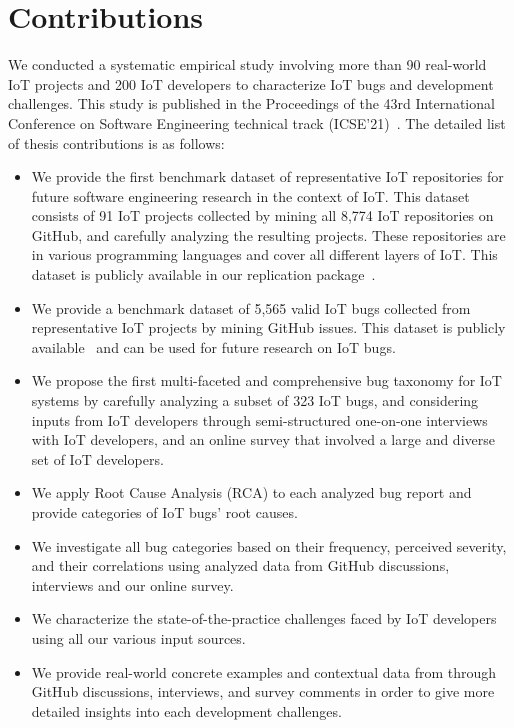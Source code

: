 \section{Contributions  }
We conducted a systematic empirical study involving more than 90 real-world IoT projects and 200 IoT developers to characterize IoT bugs and development challenges. This study is published in the Proceedings of the 43rd International Conference on Software Engineering technical track (ICSE'21)~\cite{makhshari2021iot}. The detailed list of thesis contributions is as follows:
\begin{itemize}
\item {We provide the first benchmark dataset of representative IoT repositories for future software engineering research in the context of IoT. This dataset consists of 91 IoT projects collected by mining all 8,774 IoT repositories on GitHub, and carefully analyzing the resulting projects. These repositories are in various programming languages and cover all different layers of IoT. This dataset is publicly available in our replication package~\cite{repPack}}.
\item {We provide a benchmark dataset of 5,565 valid IoT bugs collected from representative IoT projects by mining GitHub issues. This dataset is publicly available~\cite{repPack} and can be used for future research on IoT bugs.}
\item {We propose the first multi-faceted and comprehensive bug taxonomy for IoT systems by carefully analyzing a subset of 323 IoT bugs, and considering inputs from IoT developers through semi-structured one-on-one interviews with IoT developers, and an online survey that involved a large and diverse set of IoT developers.}
\item {We apply Root Cause Analysis (RCA) to each analyzed bug report and provide categories of IoT bugs' root causes.}
\item{We investigate all bug categories based on their frequency, perceived severity, and their correlations using analyzed data from GitHub discussions, interviews and our online survey.}
\item {We characterize the state-of-the-practice challenges faced by IoT developers using all our various input sources.} 
\item{We provide real-world concrete examples and contextual data from through GitHub discussions, interviews, and survey comments in order to give more detailed insights into each development challenges.}
\end{itemize}

